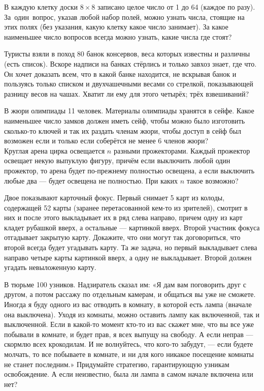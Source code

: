 \documentclass[12pt,a4paper]{article}
\begin{document}
В каждую клетку доски $8\times8$ записано целое число от 1 до 64
(каждое по разу).
За~один~вопрос, указав любой набор полей, можно
узнать числа, стоящие на этих полях
(без указания, какую клетку какое число занимает).
За какое наименьшее число
вопросов всегда можно узнать, какие числа где стоят?

Туристы взяли в поход 80 банок консервов, веса которых известны
и различны (есть список). Вскоре надписи на банках стёрлись
и только завхоз знает, где что. Он хочет
доказать всем, что в какой банке находится, не вскрывая
банок и пользуясь только списком и двухчашечными
весами со стрелкой, показывающей разницу весов на чашах.
Хватит ли ему для этого
 четыр\"ех;
 тр\"ех взвешиваний?

 В жюри олимпиады 11 человек. Материалы
олимпиады хранятся в сейфе. Какое наименьшее число замков должен иметь сейф, чтобы можно было
изготовить сколько-то ключей и так их раздать членам жюри,
чтобы доступ в сейф был возможен если и только если соберётся не менее
6 членов жюри?\\
 Круглая арена цирка освещается $n$ разными прожекторами. Каждый прожектор освещает некую выпуклую фигуру, причём если выключить любой один прожектор, то арена будет по-прежнему полностью освещена, а если выключить любые два --- будет освещена не полностью. При каких $n$ такое возможно?

Двое показывают карточный фокус.  Первый  снимает
5 карт из колоды, содержащей 52 карты (заранее перетасованной
кем-то из зрителей), смотрит в них и после этого выкладывает
их в ряд слева направо, причем одну из карт кладет рубашкой
вверх, а остальные --- картинкой вверх. Второй участник фокуса
отгадывает закрытую карту. Докажите, что они могут  так  договориться,
что второй всегда будет угадывать карту.
Та же задача, но первый %
выкладывает слева направо четыре карты картинкой вверх,
а одну не выкладывает. Второй должен угадать невыложенную карту.

 В тюрьме 100 узников. Надзиратель сказал им:
«Я дам вам поговорить друг с другом, а потом
рассажу по отдельным камерам, и общаться вы уже не
сможете. Иногда я буду одного из вас отводить в комнату,
в которой есть лампа (вначале она выключена). Уходя из
комнаты, можно оставить лампу как включенной, так
и выключенной.
Если в какой-то момент кто-то из вас скажет мне, что
вы все уже побывали в комнате, и будет прав, я всех
выпущу на свободу. А если неправ --- скормлю всех
крокодилам. И не волнуйтесь, что кого-то забудут, ---
если будете молчать, то все побываете в комнате, и ни для
кого никакое посещение комнаты не станет последним.»
Придумайте стратегию, гарантирующую узникам освобождение.
 А если неизвестно, была ли лампа в самом начале включена или нет?
\end{document}
